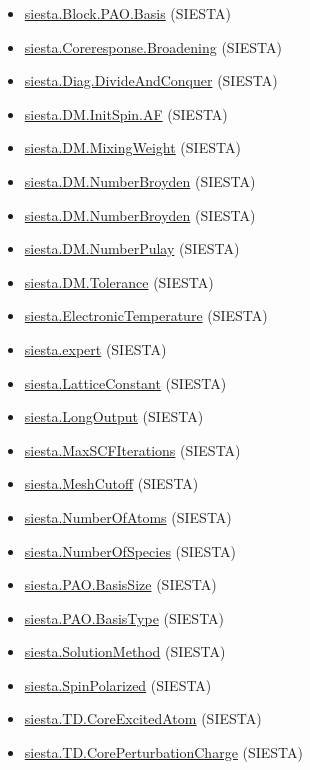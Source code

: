 \documentclass[11pt]{article}
\begin{document}
\begin{itemize}
\item \hyperref[kw:siesta-Block-PAO-Basis]{siesta.Block.PAO.Basis} (SIESTA)
\item \hyperref[kw:siesta-Coreresponse-Broadening]{siesta.Coreresponse.Broadening} (SIESTA)
\item \hyperref[kw:siesta-Diag-DivideAndConquer]{siesta.Diag.DivideAndConquer} (SIESTA)
\item \hyperref[kw:siesta-DM-InitSpin-AF]{siesta.DM.InitSpin.AF} (SIESTA)
\item \hyperref[kw:siesta-DM-MixingWeight]{siesta.DM.MixingWeight} (SIESTA)
\item \hyperref[kw:siesta-DM-NumberBroyden]{siesta.DM.NumberBroyden} (SIESTA)
\item \hyperref[kw:siesta-DM-NumberBroyden]{siesta.DM.NumberBroyden} (SIESTA)
\item \hyperref[kw:siesta-DM-NumberPulay]{siesta.DM.NumberPulay} (SIESTA)
\item \hyperref[kw:siesta-DM-Tolerance]{siesta.DM.Tolerance} (SIESTA)
\item \hyperref[kw:siesta-ElectronicTemperature]{siesta.ElectronicTemperature} (SIESTA)
\item \hyperref[kw:siesta-expert]{siesta.expert} (SIESTA)
\item \hyperref[kw:siesta-LatticeConstant]{siesta.LatticeConstant} (SIESTA)
\item \hyperref[kw:siesta-LongOutput]{siesta.LongOutput} (SIESTA)
\item \hyperref[kw:siesta-MaxSCFIterations]{siesta.MaxSCFIterations} (SIESTA)
\item \hyperref[kw:siesta-MeshCutoff]{siesta.MeshCutoff} (SIESTA)
\item \hyperref[kw:siesta-NumberOfAtoms]{siesta.NumberOfAtoms} (SIESTA)
\item \hyperref[kw:siesta-NumberOfSpecies]{siesta.NumberOfSpecies} (SIESTA)
\item \hyperref[kw:siesta-PAO-BasisSize]{siesta.PAO.BasisSize} (SIESTA)
\item \hyperref[kw:siesta-PAO-BasisType]{siesta.PAO.BasisType} (SIESTA)
\item \hyperref[kw:siesta-SolutionMethod]{siesta.SolutionMethod} (SIESTA)
\item \hyperref[kw:siesta-SpinPolarized]{siesta.SpinPolarized} (SIESTA)
\item \hyperref[kw:siesta-TD-CoreExcitedAtom]{siesta.TD.CoreExcitedAtom} (SIESTA)
\item \hyperref[kw:siesta-TD-CorePerturbationCharge]{siesta.TD.CorePerturbationCharge} (SIESTA)

\end{itemize}
\end{document}
